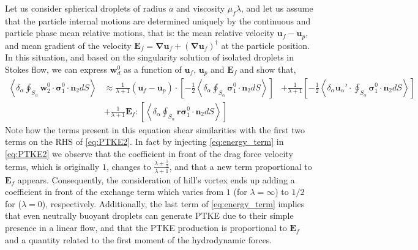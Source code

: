 \documentclass[12pt,a4paper]{article}
\newcommand{\avg}[1]{\left<#1\right>}
\renewcommand{\avg}[1]{\left<#1\right>}
\newcommand{\pavg}[1]{\avg{\delta_\alpha #1}}
\newcommand{\grad}{\mathbf{\nabla}}
\newcommand{\intS}[1]{\oint_{S_\alpha} #1 dS}
\newcommand{\pSavg}[1]{\pavg{\intS{#1}}}
\begin{document}
Let us consider spherical droplets of radius $a$ and viscosity $\mu_f \lambda$, and let us assume that the particle internal motions are determined uniquely by the continuous and particle phase mean relative motions, that is: the mean relative velocity $\textbf{u}_f - \textbf{u}_p$, and mean gradient of the velocity $\textbf{E}_f = \grad \textbf{u}_f+ (\grad \textbf{u}_f)^\dagger$ at the particle position. 
In this situation, and based on the singularity solution of isolated droplets in Stokes flow, we can express $\textbf{w}_d^0$ as a function of $\textbf{u}_f$, $\textbf{u}_p$ and $\textbf{E}_f$ and show that, 
\begin{align}
    \pSavg{\textbf{w}_2^0 \cdot \bm{\sigma}_1^0\cdot\textbf{n}_2}
    &\approx
    \frac{1}{\lambda+1}(\textbf{u}_{f} - \textbf{u}_p) \cdot \left[
        -\frac{1}{2}\pSavg{ \bm{\sigma}_1^0\cdot\textbf{n}_2}
    \right]\nonumber
    &+ \frac{1}{\lambda+1} \left[
        -\frac{1}{2}
        \pavg{\textbf{u}_\alpha' \cdot  \intS{\bm{\sigma}_1^0\cdot\textbf{n}_2}}
    \right] \nonumber
    \\
    &+ \frac{1}{\lambda + 1} \textbf{E}_{f} : \left[ 
     \pSavg{\textbf{r} \bm{\sigma}_1^0\cdot\textbf{n}_2}
    \right]
    \label{eq:energy_term}
\end{align} 
Note how the terms present in this equation shear similarities with the first two terms on the RHS of \eqref{eq:PTKE2}. 
In fact by injecting \eqref{eq:energy_term} in \eqref{eq:PTKE2} we observe that the coefficient in front of the drag force velocity terms, which is originally $1$, changes to $\frac{\lambda +\frac{1}{2}}{\lambda+1}$, and that a new term proportional to $\textbf{E}_f$ appears. 
Consequently, the consideration of hill's vortex ends up adding a coefficient in front of the exchange term which varies from $1$ (for $\lambda = \infty$) to $1/2$ for ($\lambda = 0$), respectively.  
Additionally, the last term of \eqref{eq:energy_term} implies that even neutrally buoyant droplets can generate PTKE due to their simple presence in a linear flow, and that the PTKE production is proportional to $\textbf{E}_f$ and a quantity related to the first moment of the hydrodynamic forces.  
\end{document}
